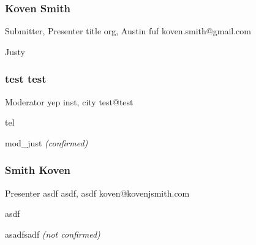 \documentclass{report}
\begin{document}
              \subsubsection*{ Koven Smith }
              Submitter, Presenter\newline
              title\newline
              org, Austin
              \newline
              fuf\newline
              koven.smith@gmail.com\newline

              Justy\newline


              
                \subsubsection*{ test test }
                Moderator\newline
                yep\newline
                inst, city
                \newline
                test@test\newline
                
                tel\newline

                mod\_just\newline
                \emph{ (confirmed) }
              

              
                \subsubsection*{ Smith Koven }
                Presenter\newline
                asdf\newline
                asdf, asdf
                \newline
                koven@kovenjsmith.com\newline
                
                asdf\newline

                asadfsadf
                \emph{ (not confirmed) }
              

              

              

              
\end{document}
